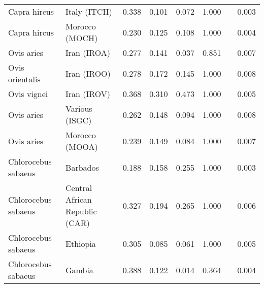 \begin{center}
\begin{adjustbox}{width = 1\textwidth}
\begin{tabular}{|l|l|r|r|r|r|r|}
        Capra hircus &                    Italy (ITCH) &                 0.338 &                                0.101 &                0.072 &                                  1.000~~ &              0.003 \\
        Capra hircus &                  Morocco (MOCH) &                 0.230 &                                0.125 &                0.108 &                                  1.000~~ &              0.004 \\
          Ovis aries &                     Iran (IROA) &                 0.277 &                                0.141 &                0.037 &                                  0.851~~ &              0.007 \\
     Ovis orientalis &                     Iran (IROO) &                 0.278 &                                0.172 &                0.145 &                                  1.000~~ &              0.008 \\
         Ovis vignei &                     Iran (IROV) &                 0.368 &                                0.310 &                0.473 &                                  1.000~~ &              0.005 \\
          Ovis aries &                  Various (ISGC) &                 0.262 &                                0.148 &                0.094 &                                  1.000~~ &              0.008 \\
          Ovis aries &                  Morocco (MOOA) &                 0.239 &                                0.149 &                0.084 &                                  1.000~~ &              0.007 \\
 Chlorocebus sabaeus &                        Barbados &                 0.188 &                                0.158 &                0.255 &                                  1.000~~ &              0.003 \\
 Chlorocebus sabaeus &  Central African Republic (CAR) &                 0.327 &                                0.194 &                0.265 &                                  1.000~~ &              0.006 \\
 Chlorocebus sabaeus &                        Ethiopia &                 0.305 &                                0.085 &                0.061 &                                  1.000~~ &              0.005 \\
 Chlorocebus sabaeus &                          Gambia &                 0.388 &                                0.122 &                0.014 &                                  0.364~~ &              0.004 \\

\end{tabular}
\end{adjustbox}
\end{center}
